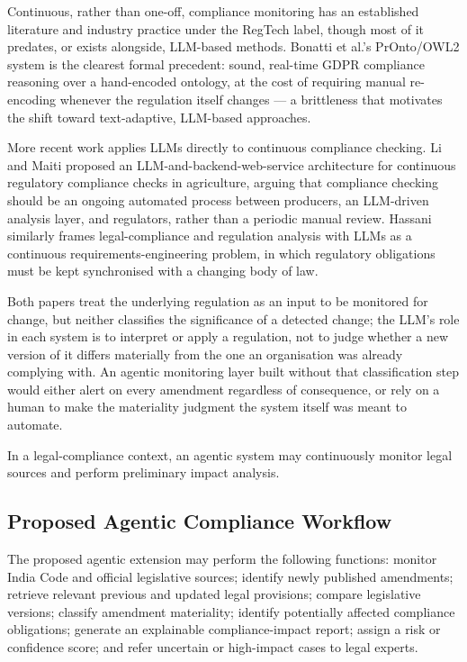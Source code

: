 Continuous, rather than one-off, compliance monitoring has an established literature and industry practice under the RegTech label, though most of it predates, or exists alongside, LLM-based methods. Bonatti et al.'s PrOnto/OWL2 system \cite{bonatti2020pronto} is the clearest formal precedent: sound, real-time GDPR compliance reasoning over a hand-encoded ontology, at the cost of requiring manual re-encoding whenever the regulation itself changes — a brittleness that motivates the shift toward text-adaptive, LLM-based approaches.

More recent work applies LLMs directly to continuous compliance checking. Li and Maiti \cite{li2025regtech} proposed an LLM-and-backend-web-service architecture for continuous regulatory compliance checks in agriculture, arguing that compliance checking should be an ongoing automated process between producers, an LLM-driven analysis layer, and regulators, rather than a periodic manual review. Hassani \cite{hassani2024llmcompliance} similarly frames legal-compliance and regulation analysis with LLMs as a continuous requirements-engineering problem, in which regulatory obligations must be kept synchronised with a changing body of law.

Both papers treat the underlying regulation as an input to be monitored for change, but neither classifies the significance of a detected change; the LLM's role in each system is to interpret or apply a regulation, not to judge whether a new version of it differs materially from the one an organisation was already complying with. An agentic monitoring layer built without that classification step would either alert on every amendment regardless of consequence, or rely on a human to make the materiality judgment the system itself was meant to automate.

In a legal-compliance context, an agentic system may continuously monitor legal sources and perform preliminary impact analysis.

\subsection{Proposed Agentic Compliance Workflow}

\label{sec:2-9-2}

The proposed agentic extension may perform the following functions: monitor India Code and official legislative sources; identify newly published amendments; retrieve relevant previous and updated legal provisions; compare legislative versions; classify amendment materiality; identify potentially affected compliance obligations; generate an explainable compliance-impact report; assign a risk or confidence score; and refer uncertain or high-impact cases to legal experts.


